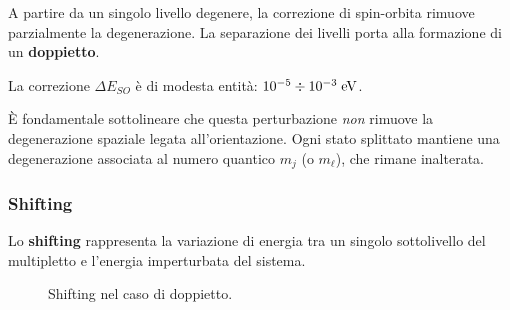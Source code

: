 A partire da un singolo livello degenere, la correzione di spin-orbita rimuove parzialmente la degenerazione. La separazione dei livelli porta alla formazione di un \textbf{doppietto}.
\begin{remark}
    La correzione \(\Delta E_{SO}\) è di modesta entità: \( 10^{-5} \divisionsymbol 10^{-3} \;\text{eV}\).
\end{remark}

\begin{attention}
    È fondamentale sottolineare che questa perturbazione \emph{non} rimuove la degenerazione spaziale legata all'orientazione. Ogni stato splittato mantiene una degenerazione associata al numero quantico \( m_j \) (o \( m_\ell \)), che rimane inalterata.
\end{attention}

\subsubsection{Shifting}

Lo \textbf{shifting} rappresenta la variazione di energia tra un singolo sottolivello del multipletto e l'energia imperturbata del sistema.

\begin{figure}[htbp]
\centering
{}
\caption{Shifting nel caso di doppietto.}
\end{figure}

